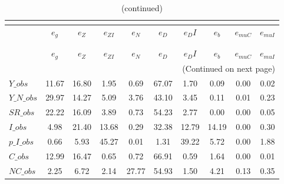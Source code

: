  
\begin{center}
\begin{longtable}{lccccccccc} 
\caption{VARIANCE DECOMPOSITION (in percent)}\\
 \label{Table:th_var_decomp_uncond}\\
\toprule 
$               $	 & 	 $        {e_g}$	 & 	 $        {e_Z}$	 & 	 $     {e_{ZI}}$	 & 	 $        {e_N}$	 & 	 $        {e_D}$	 & 	 $       {e_DI}$	 & 	 $        {e_b}$	 & 	 $    {e_{muC}}$	 & 	 $    {e_{muI}}$\\
\midrule \endfirsthead 
\caption{(continued)}\\
 \toprule \\ 
$               $	 & 	 $        {e_g}$	 & 	 $        {e_Z}$	 & 	 $     {e_{ZI}}$	 & 	 $        {e_N}$	 & 	 $        {e_D}$	 & 	 $       {e_DI}$	 & 	 $        {e_b}$	 & 	 $    {e_{muC}}$	 & 	 $    {e_{muI}}$\\
\midrule \endhead 
\midrule \multicolumn{10}{r}{(Continued on next page)} \\ \bottomrule \endfoot 
\bottomrule \endlastfoot 
$Y\_obs         $	 & 	        11.67	 & 	        16.80	 & 	         1.95	 & 	         0.69	 & 	        67.07	 & 	         1.70	 & 	         0.09	 & 	         0.00	 & 	         0.02 \\ 
$Y\_N\_obs      $	 & 	        29.97	 & 	        14.27	 & 	         5.09	 & 	         3.76	 & 	        43.10	 & 	         3.45	 & 	         0.11	 & 	         0.01	 & 	         0.23 \\ 
$SR\_obs        $	 & 	        22.22	 & 	        16.09	 & 	         3.89	 & 	         0.73	 & 	        54.23	 & 	         2.77	 & 	         0.00	 & 	         0.00	 & 	         0.05 \\ 
$I\_obs         $	 & 	         4.98	 & 	        21.40	 & 	        13.68	 & 	         0.29	 & 	        32.38	 & 	        12.79	 & 	        14.19	 & 	         0.00	 & 	         0.30 \\ 
$p\_I\_obs      $	 & 	         0.66	 & 	         5.93	 & 	        45.27	 & 	         0.01	 & 	         1.31	 & 	        39.22	 & 	         5.72	 & 	         0.00	 & 	         1.88 \\ 
$C\_obs         $	 & 	        12.99	 & 	        16.47	 & 	         0.65	 & 	         0.72	 & 	        66.91	 & 	         0.59	 & 	         1.64	 & 	         0.00	 & 	         0.01 \\ 
$NC\_obs        $	 & 	         2.25	 & 	         6.72	 & 	         2.14	 & 	        27.77	 & 	        54.93	 & 	         1.50	 & 	         4.21	 & 	         0.13	 & 	         0.35 \\ 

\end{longtable}
\end{center}
